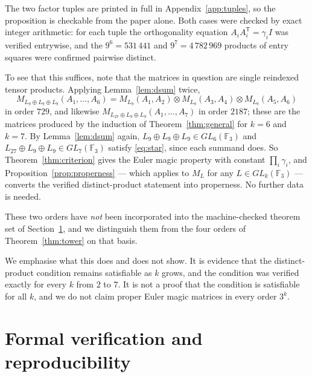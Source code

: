 \documentclass[11pt,a4paper]{amsart}
\theoremstyle{plain}
\theoremstyle{definition}
\theoremstyle{remark}
\newcommand{\FF}{\mathbb{F}}
\newcommand{\tr}{\mathsf{T}}
\begin{document}
The two factor tuples are printed in full in Appendix~\ref{app:tuples}, so the
proposition is checkable from the paper alone. Both cases were checked by exact
integer arithmetic: for each tuple the orthogonality equation
$A_iA_i^{\tr}=\gamma_i I$ was verified entrywise, and the $9^6=531\,441$ and
$9^7=4\,782\,969$ products of entry squares were confirmed pairwise distinct.

To see that this suffices, note that the matrices in question are single
reindexed tensor products. Applying Lemma~\ref{lem:dsum} twice,
\[
M_{L_9\oplus L_9\oplus L_9}(A_1,\dots,A_6)
=M_{L_9}(A_1,A_2)\otimes M_{L_9}(A_3,A_4)\otimes M_{L_9}(A_5,A_6)
\]
in order $729$, and likewise
$M_{L_{27}\oplus L_9\oplus L_9}(A_1,\dots,A_7)$ in order $2187$; these are the
matrices produced by the induction of Theorem~\ref{thm:general} for $k=6$ and
$k=7$. By Lemma~\ref{lem:dsum} again, $L_9\oplus L_9\oplus L_9\in GL_6(\FF_3)$
and $L_{27}\oplus L_9\oplus L_9\in GL_7(\FF_3)$ satisfy \eqref{eq:star}, since
each summand does. So Theorem~\ref{thm:criterion} gives the Euler magic property
with constant $\prod_i\gamma_i$, and Proposition~\ref{prop:properness} --- which
applies to $M_L$ for any $L\in GL_k(\FF_3)$ --- converts the verified
distinct-product statement into properness. No further data is needed.

These two orders have \emph{not} been incorporated into the machine-checked
theorem set of Section~\ref{sec:verification}, and we distinguish them from the
four orders of Theorem~\ref{thm:tower} on that basis.

We emphasise what this does and does not show. It is evidence that the
distinct-product condition remains satisfiable as $k$ grows, and the condition
was verified exactly for every $k$ from $2$ to $7$. It is not a proof that the
condition is satisfiable for all $k$, and we do not claim proper Euler magic
matrices in every order $3^k$.

\section{Formal verification and reproducibility}\label{sec:verification}
\end{document}
